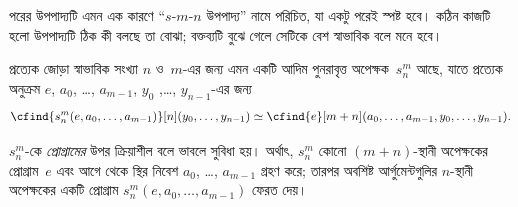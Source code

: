 \documentclass[../../../include/open-logic-section]{subfiles}
\begin{document}

\begin{explain}
পরের উপপাদ্যটি এমন এক কারণে “$s$-$m$-$n$ উপপাদ্য” নামে পরিচিত, যা একটু
পরেই স্পষ্ট হবে। কঠিন কাজটি হলো উপপাদ্যটি ঠিক কী বলছে তা বোঝা; বক্তব্যটি
বুঝে গেলে সেটিকে বেশ স্বাভাবিক বলে মনে হবে।
\end{explain}

\begin{thm}
  প্রত্যেক জোড়া স্বাভাবিক সংখ্যা $n$ ও~$m$-এর জন্য এমন একটি আদিম
  পুনরাবৃত্ত অপেক্ষক~$s^m_n$ আছে, যাতে প্রত্যেক অনুক্রম
  $e$, $a_0$, \dots, $a_{m-1}$, $y_0$ ,\dots, $y_{n-1}$-এর জন্য
  \[
  \cfind{s^m_n(e, a_0, \dots, a_{m-1})}[n](y_0, \dots, y_{n-1}) \simeq
  \cfind{e}[m+n](a_0, \dots, a_{m-1}, y_0, \dots, y_{n-1}).
\]
\end{thm}

\begin{explain}
$s^m_n$-কে \emph{প্রোগ্রামের} উপর ক্রিয়াশীল বলে ভাবলে সুবিধা হয়। অর্থাৎ,
$s^m_n$ কোনো $(m+n)$-স্থানী অপেক্ষকের প্রোগ্রাম~$e$ এবং আগে থেকে স্থির
নিবেশ $a_0$, \dots, $a_{m-1}$ গ্রহণ করে; তারপর অবশিষ্ট আর্গুমেন্টগুলির
$n$-স্থানী অপেক্ষকের একটি প্রোগ্রাম $s^m_n(e, a_0, \dots, a_{m-1})$
ফেরত দেয়। 
\end{explain}
\end{document}
